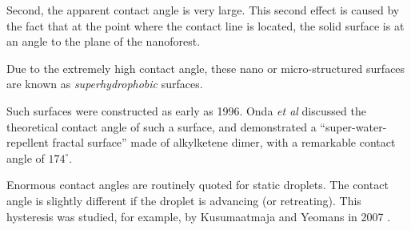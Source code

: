 \documentclass[a4paper]{report}
\begin{document}
Second, the apparent contact angle is very large.  This second effect is caused by the fact that at the point where the contact line is located, the solid surface is at an angle to the plane of the nanoforest.

\begin{center}
\end{center}

Due to the extremely high contact angle, these nano or micro-structured surfaces are known as \emph{superhydrophobic} surfaces.


\vspace*{1em}
Such surfaces were constructed as early as 1996.  Onda \emph{et al} \cite{Onda1996} discussed the theoretical contact angle of such a surface, and demonstrated a ``super-water-repellent fractal surface'' made of alkylketene dimer, with a remarkable contact angle of $174^{\circ}$.

Enormous contact angles are routinely quoted for static droplets.  The contact angle is slightly different if the droplet is advancing (or retreating).  This hysteresis was studied, for example, by Kusumaatmaja and Yeomans in 2007 \cite{KusumaatmajaYeomans2007}.
\end{document}
